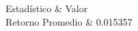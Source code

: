 \begin{table}[H]
\caption{Retorno Promedio}
\label{tab:retorno_promedio}
\begin{tabular}
\toprule
Estad\'istico & Valor \\
\midrule
Retorno Promedio & 0.015357 \\
\bottomrule
\end{tabular}
\end{table}
